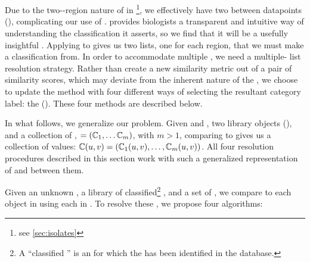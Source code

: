 \section{\krap{}}\label{sec:krap}
Due to the two-\itsshort{}-region nature of \ecoli{} \isols{} in \cplop{}\footnote{see \autoref{sec:isolates}}, we effectively have two \compfuncs{} between datapoints (\isols{}), complicating our use of \kNN{}.
\kNN{} provides \cplop{} biologists a transparent and intuitive way of understanding the \spec{} classification it asserts, so we find that it will be a usefully insightful .
Applying \kNN{} to \cplop{} \isols{} gives us two lists, one for each \itsshort{} region, that we must make a classification from.
In order to accommodate multiple \compfuncs{}, we need a multiple-\knnlong{} list resolution strategy.
Rather than create a new similarity metric out of a pair of similarity scores, which may deviate from the inherent nature of the \compfunc{}, we choose to update the \kNN{} method with four different ways of selecting the resultant category label: the \kraplong{} (\krap{}).
These four methods are described below.

In what follows, we generalize our problem. Given \UNKNOWN{} and \KNOWN{}, two library objects (\isols{}), and a collection of \compfuncs{}, \COMP{}$=(\mathbb{C}{}_1,\ldots \mathbb{C}{}_m)$, with $m > 1$, comparing \UNKNOWN{} to \KNOWN{} gives us a collection of values:  
$\mathbb{C}{}(u{},v{}) = (\mathbb{C}{}_1(u{},v{}),\ldots,\mathbb{C}{}_m(u{},v{}))$.
All four resolution procedures described in this section work with such a generalized representation of \isols{} and \compfuncs{} between them.

Given an unknown \isol{} \UNKNOWN{}, a library of classified\footnote{A ``classified \isol{}'' is an \isol{} for which the \spec{} has been identified in the database.} \isols{} \LIB{}, and a set of \compfuncs{} \COMP{}, we compare \UNKNOWN{} to each object in \LIB{} using each \compfunc{} in \COMP{}. To resolve these \compfuncs{}, we propose four algorithms:

